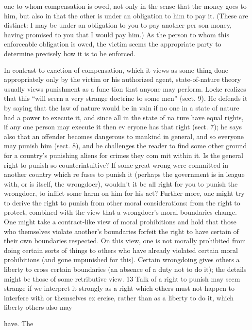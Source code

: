 \documentclass[11pt,openany]{book}
\begin{document}
one to whom compensation is owed, not only in the sense that the money goes to him, but also in that the other is under an obligation to him to pay it. (These are distinct: I may be under an obligation to you to pay another per son money, having promised to you that I would pay him.) As the person to whom this enforceable obligation is owed, the victim seems the appropriate party to determine precisely how it is to be enforced. 

In contrast to exaction of compensation, which it views as some thing done appropriately only by the victim or his authorized agent, state-of-nature theory usually views punishment as a func tion that anyone may perform. Locke realizes that this ``will seern a very strange doctrine to some men'' (sect. 9). He defends it by saying that the law of nature would be in vain if no one in a state of nature had a power to execute it, and since all in the state of na ture have equal rights, if any one person may execute it then ev eryone has that right (sect. 7); he says also that an offender becomes dangerous to mankind in general, and so everyone may punish him (sect. 8), and he challenges the reader to find some other ground for a country's punishing aliens for crimes they com mit within it. Is the general right to punish so counterintuitive? If some great wrong were committed in another country which re fuses to punish it (perhaps the government is in league with, or is itself, the wrongdoer), wouldn't it be all right for you to punish the wrongdoer, to inflict some harm on him for his act? Further more, one might try to derive the right to punish from other moral considerations: from the right to protect, combined with the view that a wrongdoer's moral boundaries change. One might take a contract-like view of moral prohibitions and hold that those who themselves violate another's boundaries forfeit the right to have certain of their own boundaries respected. On this view, one is not morally prohibited from doing certain sorts of things to others who have already violated certain moral prohibitions (and gone unpunished for this). Certain wrongdoing gives others a liberty to cross certain boundaries (an absence of a duty not to do it); the details might be those of some retributive view. 13 Talk of a right to punish may seem strange if we interpret it strongly as a right which others must not happen to interfere with or themselves ex ercise, rather than as a liberty to do it, which liberty others also may 

have. The 
\end{document}
